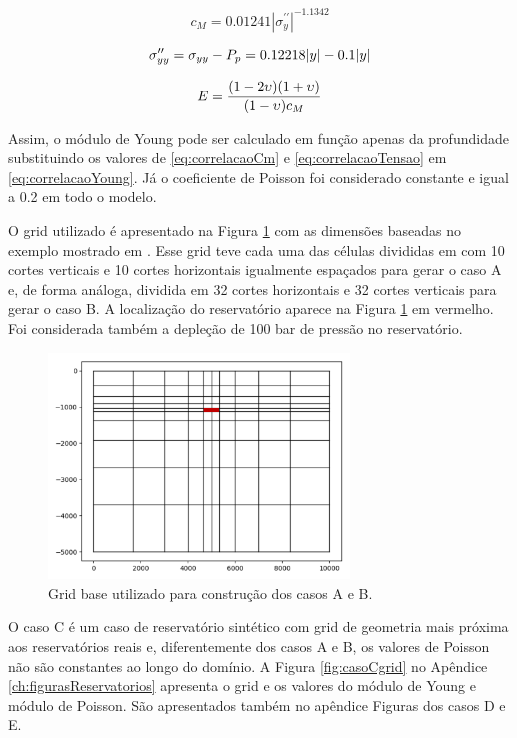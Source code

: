 \begin{equation} \label{eq:correlacaoCm}
    c_M = 0.01241 |\sigma_y^{\prime\prime}|^{-1.1342}
\end{equation}

\begin{equation} \label{eq:correlacaoTensao}
\sigma^{\prime\prime}_{yy} = \sigma_{yy} - P_p = 0.12218|y| - 0.1 |y|
\end{equation}

\begin{equation} \label{eq:correlacaoYoung}
    E = \frac{(1-2\upsilon)(1+\upsilon)}{(1-\upsilon)c_M}
\end{equation}

Assim, o módulo de Young pode ser calculado em função apenas da profundidade substituindo os valores de \eqref{eq:correlacaoCm} e \eqref{eq:correlacaoTensao} em \eqref{eq:correlacaoYoung}. Já o coeficiente de Poisson foi considerado constante e igual a 0.2 em todo o modelo. 


O grid utilizado é apresentado na Figura \ref{fig:gridBase10x10} com as dimensões baseadas no exemplo mostrado em \cite{casteletto}. Esse grid teve cada uma das células divididas em com 10 cortes verticais e 10 cortes horizontais igualmente espaçados  para gerar o caso A e, de forma análoga, dividida em 32 cortes horizontais e 32 cortes verticais para gerar o caso B. A localização do reservatório aparece na Figura \ref{fig:gridBase10x10} em vermelho. Foi considerada também a depleção de 100 bar de pressão no reservatório.

\begin{figure}[!htbp]
    \centering
    \includegraphics[height=6cm]{chap08/figs/Reservoir10x10_grid.png}
    \caption{Grid base utilizado para construção dos casos A e B.}
    \label{fig:gridBase10x10}
\end{figure}


\if{}
O caso C é um caso de reservatório sintético com grid de geometria mais próxima aos reservatórios reais e, diferentemente dos casos A e B, os valores de Poisson não são constantes ao longo do domínio. A Figura \ref{fig:casoCgrid} no Apêndice \ref{ch:figurasReservatorios} apresenta o grid e os valores do módulo de Young e módulo de Poisson. São apresentados também no apêndice Figuras dos casos D e E.
\else


